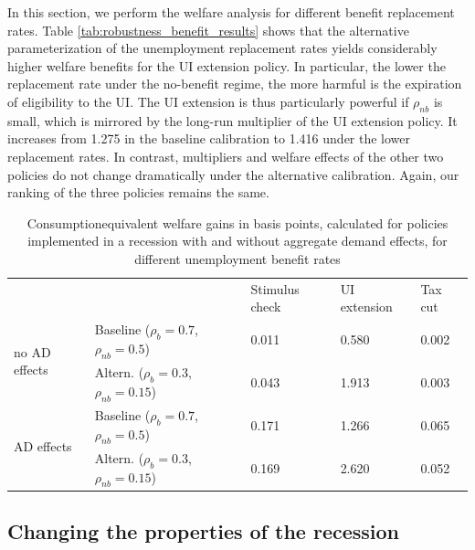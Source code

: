 \documentclass[\econtexRoot/HAFiscal]{subfiles}
\begin{document}
In this section, we perform the welfare analysis for different benefit replacement rates. Table \ref{tab:robustness_benefit_results} shows that the alternative parameterization of the unemployment replacement rates yields considerably higher welfare benefits for the UI extension policy. In particular, the lower the replacement rate under the no-benefit regime, the more harmful is the expiration of eligibility to the UI. The UI extension is thus particularly powerful if $\rho_{nb}$ is small, which is mirrored by the long-run multiplier of the UI extension policy. It increases from 1.275 in the baseline calibration to 1.416 under the lower replacement rates. In contrast, multipliers and welfare effects of the other two policies do not change dramatically under the alternative calibration. Again, our ranking of the three policies remains the same.


\begin{table}[]
  \begin{center}
    \begin{tabular}{@{}lllll@{}}
      \toprule
      &                    & Stimulus check & UI extension & Tax cut \\ \cmidrule(l){1-5} 
      \multirow{2}{*}{no AD effects} 	& Baseline  ($\rho_{b}=0.7$, $\rho_{nb}=0.5$) 		& 0.011          & 0.580        & 0.002   \\
      & Altern.  ($\rho_{b}=0.3$, $\rho_{nb}=0.15$) 	& 0.043          & 1.913        & 0.003   \\ \cmidrule(l){1-5} 
      \multirow{2}{*}{AD effects}		& Baseline  ($\rho_{b}=0.7$, $\rho_{nb}=0.5$)    	& 0.171          & 1.266        & 0.065   \\
      & Altern.  ($\rho_{b}=0.3$, $\rho_{nb}=0.15$)    & 0.169          & 2.620        & 0.052   \\ \cmidrule(l){1-5} 
    \end{tabular}
    \caption{Consumptionequivalent welfare gains in basis points, calculated for policies implemented in a recession with and without aggregate demand effects, for different unemployment benefit rates}
    \notinsubfile{\label{tab:robustness_benefit_results}}
  \end{center}
\end{table}




\FloatBarrier
\subsection{Changing the properties of the recession}
\end{document}
